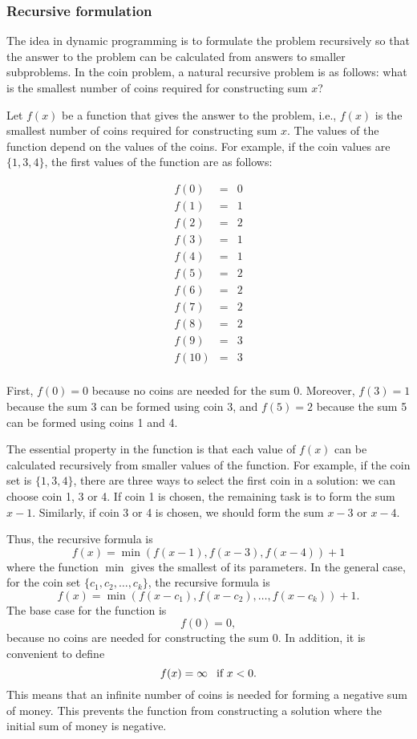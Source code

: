 \subsubsection{Recursive formulation}

The idea in dynamic programming is to
formulate the problem recursively so
that the answer to the problem can be
calculated from answers to smaller
subproblems.
In the coin problem, a natural recursive
problem is as follows:
what is the smallest number of coins
required for constructing sum $x$?

Let $f(x)$ be a function that gives the answer
to the problem, i.e., $f(x)$ is the smallest
number of coins required for constructing sum $x$.
The values of the function depend on the
values of the coins.
For example, if the coin values are $\{1,3,4\}$,
the first values of the function are as follows:

\[
\begin{array}{lcl}
f(0) & = & 0 \\
f(1) & = & 1 \\
f(2) & = & 2 \\
f(3) & = & 1 \\
f(4) & = & 1 \\
f(5) & = & 2 \\
f(6) & = & 2 \\
f(7) & = & 2 \\
f(8) & = & 2 \\
f(9) & = & 3 \\
f(10) & = & 3 \\
\end{array}
\]

First, $f(0)=0$ because no coins are needed
for the sum $0$.
Moreover, $f(3)=1$ because the sum $3$
can be formed using coin 3,
and $f(5)=2$ because the sum 5 can
be formed using coins 1 and 4.

The essential property in the function is
that each value of $f(x)$ can be calculated
recursively from smaller values of the function.
For example, if the coin set is $\{1,3,4\}$,
there are three ways to select the first coin
in a solution: we can choose coin 1, 3 or 4.
If coin 1 is chosen, the remaining task is to
form the sum $x-1$.
Similarly, if coin 3 or 4 is chosen,
we should form the sum $x-3$ or $x-4$.

Thus, the recursive formula is
\[f(x) = \min(f(x-1),f(x-3),f(x-4))+1\]
where the function $\min$ gives the smallest
of its parameters.
In the general case, for the coin set
$\{c_1,c_2,\ldots,c_k\}$,
the recursive formula is
\[f(x) = \min(f(x-c_1),f(x-c_2),\ldots,f(x-c_k))+1.\]
The base case for the function is
\[f(0)=0,\]
because no coins are needed for constructing
the sum 0.
In addition, it is convenient to define
\[f(x)=\infty\hspace{8px}\textrm{if $x<0$}.\]
This means that an infinite number of coins
is needed for forming a negative sum of money.
This prevents the function from constructing
a solution where the initial sum of money is negative.

